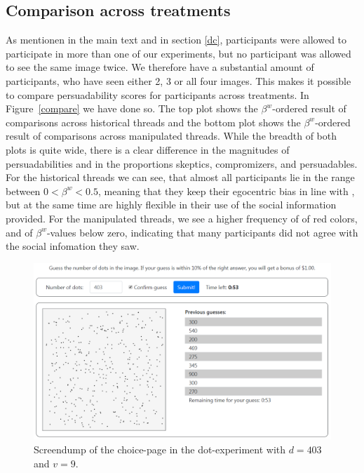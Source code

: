 \documentclass[9pt,twoside,lineno]{pnas-new}
\begin{document}
\subsection*{Comparison across treatments}
As mentionen in the main text and in section \ref{dc}, participants were allowed to participate in more than one of our experiments, but no participant was allowed to see the same image twice. We therefore have a substantial amount of participants, who have seen either 2, 3 or all four images. This makes it possible to compare persuadability scores for participants across treatments. In Figure~\ref{compare} we have done so. The top plot shows the $\beta^w$-ordered result of comparisons across historical threads and the bottom plot shows the $\beta^w$-ordered result of comparisons across manipulated threads. While the breadth of both plots is quite wide, there is a clear difference in the magnitudes of persuadabilities and in the proportions skeptics, compromizers, and persuadables. For the historical threads we can see, that almost all participants lie in the range between $0 < \beta^w < 0.5$, meaning that they keep their egocentric bias in line with \citet{rader2017advice}, but at the same time are highly flexible in their use of the social information provided. For the manipulated threads, we see a higher frequency of  of red colors, and of $\beta^w$-values below zero, indicating that many participants did not agree with the social infomation they saw.  


\begin{figure}
\centering
\includegraphics[width=.8\textwidth]{../Screenshots/FigS1.png}
\caption{Screendump of the choice-page in the dot-experiment with $d=403$ and $v=9$.}
\label{fig:S1}
\end{figure}
\end{document}
